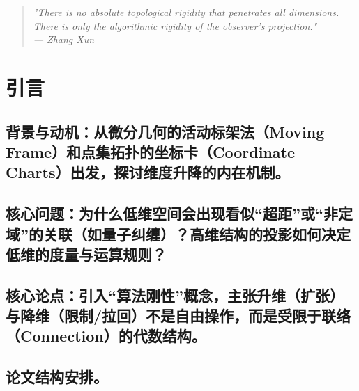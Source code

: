 \documentclass[11pt,a4paper]{article}
\begin{document}
\begin{quote}
\itshape
"There is no absolute topological rigidity that penetrates all dimensions. \\ 
There is only the algorithmic rigidity of the observer's projection." \\
\upshape --- Zhang Xun
\end{quote}

\begin{abstract}
本文建立了一套名为“认知流形”（Cognitive Manifold）的公理化框架，以解决维度变换中的算法刚性问题。通过在四维紧致流形上引入结构层、观测者测地线与边界算子，我们证明了代数、几何、拓扑与认知四大诱导函子的范畴同构（公理A2）。基于联络1-形式及其嘉当结构方程，我们构造了从底空间到纤维丛的升维扩张函子 \(E\) 与降维限制函子 \(R\)，并证明它们构成伴随对 \(E \dashv R\)。在此基础上，我们严格证明了算术系统中小数乘法的尺度算子（定理 3.1）与量子纠缠的非定域性（定理 4.1），本质上分别是高维代数谱与高维纤维丛曲率在低维底空间上的全息投影。最后，通过构造认知流形边界上的非平凡障碍类 \(\mathfrak{O}_{P/NP}\)，我们证明了 P \(\neq\) NP，并论证了“不存在穿透所有维度的绝对拓扑刚性”这一核心结论。
\end{abstract}

\tableofcontents
\clearpage

\section{引言}
\subsection{背景与动机：从微分几何的活动标架法（Moving Frame）和点集拓扑的坐标卡（Coordinate Charts）出发，探讨维度升降的内在机制。}
\subsection{核心问题：为什么低维空间会出现看似“超距”或“非定域”的关联（如量子纠缠）？高维结构的投影如何决定低维的度量与运算规则？}
\subsection{核心论点：引入“算法刚性”概念，主张升维（扩张）与降维（限制/拉回）不是自由操作，而是受限于联络（Connection）的代数结构。}
\subsection{论文结构安排。}
\end{document}
